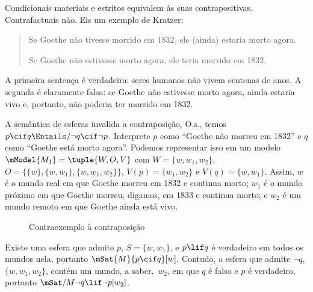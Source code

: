 \documentclass[../../../include/open-logic-section]{subfiles}
\begin{document}


Condicionais materiais e estritos equivalem às suas
contrapositivas. Contrafactuais não. Eis um exemplo de
Kratzer:
\begin{quote}
  Se Goethe não tivesse morrido em 1832, ele (ainda) estaria morto agora.

  Se Goethe não estivesse morto agora, ele teria morrido em 1832.
\end{quote}
A primeira sentença é verdadeira: seres humanos não vivem centenas de anos. A
segunda é claramente falsa: se Goethe não estivesse morto agora, ainda estaria
vivo e, portanto, não poderia ter morrido em 1832.

\begin{ex}
  A semântica de esferas invalida a contraposição, O.s.\@, temos $p
  \cif q \Entails/ \lnot q \cif \lnot p$. Interprete $p$ como ``Goethe
  não morreu em 1832'' e $q$ como ``Goethe está morto agora''. Podemos
  representar isso em um modelo $\mModel{M_1} = \tuple{W, O, V}$ com $W =
  \{w, w_1, w_2\}$, $O = \{\{w\}, \{w, w_1\}, \{w, w_1, w_2\}\}$,
  $V(p) = \{w_1, w_2\}$ e $V(q) = \{w, w_1\}$. Assim, $w$ é o mundo
  real em que Goethe morreu em 1832 e continua morto; $w_1$ é o
  mundo próximo em que Goethe morreu, digamos, em 1833 e continua morto;
  e $w_2$ é um mundo remoto em que Goethe ainda está vivo.
\begin{figure}
\begin{center}
\caption{Contraexemplo à contraposição}
\end{center}
\end{figure}
Existe uma esfera que admite $p$, $S =
\{w, w_1\}$, e $p \lif q$ é verdadeiro em todos os mundos nela, portanto $\mSat{M}{p
  \cif q}[w]$. Contudo, a esfera que admite $\lnot q$, $\{w, w_1,
w_2\}$, contém um mundo, a saber,~$w_2$, em que $q$ é falso e $p$ é
verdadeiro, portanto $\mSat/{M}{\lnot q \lif \lnot p}[w_2]$.
\end{ex}
\end{document}
